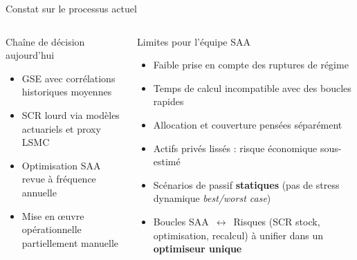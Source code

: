 \documentclass[aspectratio=169,11pt]{beamer}
\newcommand{\highlight}[1]{\textcolor{GeneraliRed}{\textbf{#1}}}
\begin{document}
\begin{frame}[shrink=15]{Constat sur le processus actuel}
  \begin{columns}[T,totalwidth=\textwidth]
    \begin{block}{Chaîne de décision aujourd'hui}
      \begin{itemize}
        \item GSE avec corrélations historiques moyennes
        \item SCR lourd via modèles actuariels et proxy LSMC
        \item Optimisation SAA revue à fréquence annuelle
        \item Mise en œuvre opérationnelle partiellement manuelle
      \end{itemize}
    \end{block}

    \begin{block}{Limites pour l'équipe SAA}
      \begin{itemize}
        \item Faible prise en compte des ruptures de régime
        \item Temps de calcul incompatible avec des boucles rapides
        \item Allocation et couverture pensées séparément
        \item Actifs privés lissés : risque économique sous-estimé
        \item Scénarios de passif \highlight{statiques} (pas de stress dynamique \emph{best/worst case})
        \item Boucles SAA~$\leftrightarrow$~Risques (SCR stock, optimisation, recalcul) à unifier dans un \highlight{optimiseur unique}
      \end{itemize}
    \end{block}
  \end{columns}
\end{frame}
\end{document}
